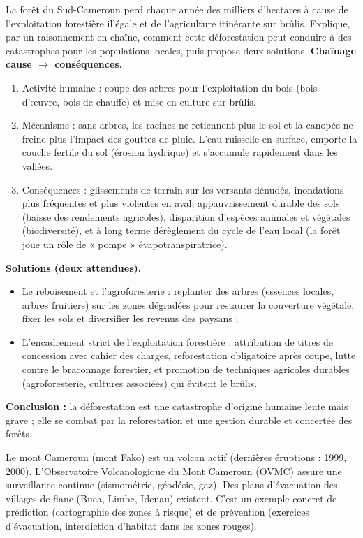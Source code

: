 \documentclass[11pt]{article}
\newcommand{\cle}[1]{{\popxbold\color{popdark}#1}}
\begin{document}
\begin{exoresolu}
La forêt du Sud-Cameroun perd chaque année des milliers d'hectares à cause de l'exploitation forestière illégale et de l'agriculture itinérante sur brûlis. Explique, par un raisonnement en chaîne, comment cette déforestation peut conduire à des catastrophes pour les populations locales, puis propose deux solutions.
\tcblower
\textbf{Chaînage cause $\rightarrow$ conséquences.}
\begin{enumerate}
\item Activité humaine : coupe des arbres pour l'exploitation du bois (bois d'œuvre, bois de chauffe) et mise en culture sur brûlis.
\item Mécanisme : sans arbres, les racines ne retiennent plus le sol et la canopée ne freine plus l'impact des gouttes de pluie. L'eau ruisselle en surface, emporte la couche fertile du sol (érosion hydrique) et s'accumule rapidement dans les vallées.
\item Conséquences : glissements de terrain sur les versants dénudés, inondations plus fréquentes et plus violentes en aval, appauvrissement durable des sols (baisse des rendements agricoles), disparition d'espèces animales et végétales (biodiversité), et à long terme dérèglement du cycle de l'eau local (la forêt joue un rôle de « pompe » évapotranspiratrice).
\end{enumerate}
\textbf{Solutions (deux attendues).}
\begin{itemize}
\item Le reboisement et l'agroforesterie : replanter des arbres (essences locales, arbres fruitiers) sur les zones dégradées pour restaurer la couverture végétale, fixer les sols et diversifier les revenus des paysans ;
\item L'encadrement strict de l'exploitation forestière : attribution de titres de concession avec cahier des charges, reforestation obligatoire après coupe, lutte contre le braconnage forestier, et promotion de techniques agricoles durables (agroforesterie, cultures associées) qui évitent le brûlis.
\end{itemize}
\textbf{Conclusion :} la déforestation est une catastrophe d'origine humaine lente mais grave ; elle se combat par la reforestation et une gestion durable et concertée des forêts.
\end{exoresolu}

\begin{savaistu}
Le mont Cameroun (mont Fako) est un volcan actif (dernières éruptions : 1999, 2000). L'Observatoire Volcanologique du Mont Cameroun (OVMC) assure une surveillance continue (sismométrie, géodésie, gaz). Des plans d'évacuation des villages de flanc (Buea, Limbe, Idenau) existent. C'est un exemple concret de \cle{prédiction} (cartographie des zones à risque) et de \cle{prévention} (exercices d'évacuation, interdiction d'habitat dans les zones rouges).
\end{savaistu}
\end{document}
